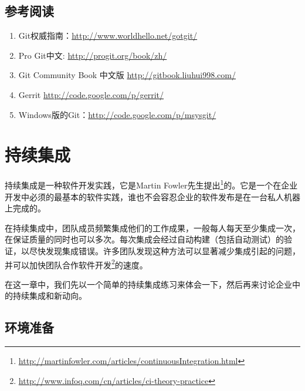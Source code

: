 \section{参考阅读}
\label{参考阅读}

\begin{enumerate}
\item Git权威指南：\href{http://www.worldhello.net/gotgit/}{http:/\slash www.worldhello.net\slash gotgit\slash }

\item Pro Git中文: \href{http://progit.org/book/zh/}{http:/\slash progit.org\slash book\slash zh\slash }

\item Git Community Book 中文版 \href{http://gitbook.liuhui998.com/}{http:/\slash gitbook.liuhui998.com\slash }

\item Gerrit \href{http://code.google.com/p/gerrit/}{http:/\slash code.google.com\slash p\slash gerrit\slash }

\item Windows版的Git：\href{http://code.google.com/p/msysgit/}{http:/\slash code.google.com\slash p\slash msysgit\slash }

\end{enumerate}

\chapter{持续集成}
\label{持续集成}

持续集成是一种软件开发实践，它是Martin Fowler先生提出\footnote{\href{http://martinfowler.com/articles/continuousIntegration.html}{http:/\slash martinfowler.com\slash articles\slash continuousIntegration.html}}的。它是一个在企业开发中必须的最基本的软件实践，谁也不会容忍企业的软件发布是在一台私人机器上完成的。

在持续集成中，团队成员频繁集成他们的工作成果，一般每人每天至少集成一次，在保证质量的同时也可以多次。每次集成会经过自动构建（包括自动测试）的验证，以尽快发现集成错误。许多团队发现这种方法可以显著减少集成引起的问题，并可以加快团队合作软件开发\footnote{\href{http://www.infoq.com/cn/articles/ci-theory-practice}{http:/\slash www.infoq.com\slash cn\slash articles\slash ci-theory-practice}}的速度。

在这一章中，我们先以一个简单的持续集成练习来体会一下，然后再来讨论企业中的持续集成和新动向。

\section{环境准备}
\label{环境准备}

